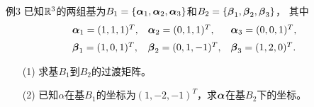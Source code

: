 \begin{frame}
  \begin{footnotesize}
    \begin{exampleblock}{例3}
      已知$\mathbb{R}^3$的两组基为$B_1=\{\boldsymbol{\alpha}_1,\boldsymbol{\alpha}_2,\boldsymbol{\alpha}_3\}$和$B_2=\{\boldsymbol{\beta}_1,\boldsymbol{\beta}_2,\boldsymbol{\beta}_3\}$，
      其中
      $$
      \begin{array}{lll}
        \boldsymbol{\alpha}_1=(1,1,1)^T,&\boldsymbol{\alpha}_2=(0,1,1)^T,&\boldsymbol{\alpha}_3=(0,0,1)^T, \\[0.2cm]
        \boldsymbol{\beta}_1=(1,0,1)^T,&\boldsymbol{\beta}_2=(0,1,-1)^T,&\boldsymbol{\beta}_3=(1,2,0)^T.  
      \end{array}
      $$
      \begin{itemize}
      \item[(1)] 求基$B_1$到$B_2$的过渡矩阵。
      \item[(2)] 已知$\alpha$在基$B_1$的坐标为$(1,-2,-1)^T$，求$\boldsymbol{\alpha}$在基$B_2$下的坐标。
      \end{itemize}
      
    \end{exampleblock}
  \end{footnotesize}
\end{frame}


